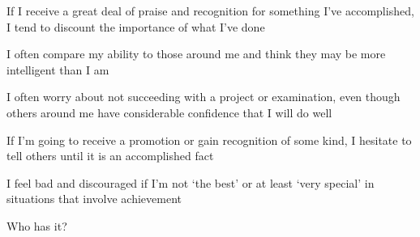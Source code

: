 \documentclass[aspectratio=169]{beamer}
\begin{document}
\begin{frame}
  \begin{center}
    \Huge     If  I  receive  a  great  deal  of  praise  and  recognition  for  something  I’ve  accomplished,  I  tend  to  discount  the  importance
  of  what  I’ve  done
\end{center}
\end{frame}

\begin{frame}
  \begin{center}
    \Huge     I often compare my ability to those around me and think they may be more intelligent than I am
  \end{center}
\end{frame}

\begin{frame}
  \begin{center}
    \Huge      I often worry about not succeeding with a project or examination, even though others around me have considerable
confidence that I will do well
\end{center}
\end{frame}

\begin{frame}
  \begin{center}
    \Huge       If  I’m  going  to  receive  a  promotion  or  gain  recognition  of  some  kind,  I  hesitate  to  tell  others  until  it  is  an
  accomplished fact
\end{center}
\end{frame}

\begin{frame}
  \begin{center}
    \Huge  I  feel  bad  and  discouraged  if  I’m  not  `the  best'  or  at  least  `very  special'  in  situations  that  involve  achievement
\end{center}
\end{frame}

\begin{frame}
  \begin{center}
    \Huge Who has it?
    \\ \small \cite{clanceimes78}
    \\ \small \cite{attr98}
    \\ \small \cite{colour}
  \end{center}
\end{frame}
\end{document}
